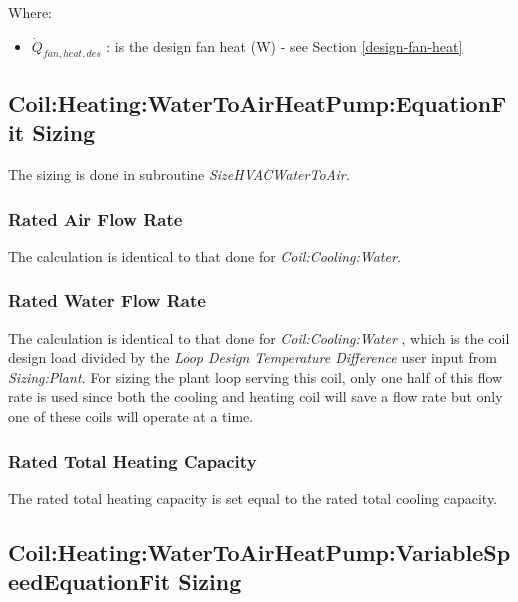 Where:

\begin{itemize}
\item
  \(\dot{Q}_{fan,heat,des}\) : is the design fan heat (W) - see Section \ref{design-fan-heat}
\end{itemize}

\subsection{Coil:Heating:WaterToAirHeatPump:EquationFit Sizing}\label{coilheatingwatertoairheatpumpequationfit-sizing}

The sizing is done in subroutine \emph{SizeHVACWaterToAir.}

\subsubsection{Rated Air Flow Rate}\label{rated-air-flow-rate-2}

The calculation is identical to that done for \emph{Coil:Cooling:Water}.

\subsubsection{Rated Water Flow Rate}\label{rated-water-flow-rate-2}

The calculation is identical to that done for \emph{Coil:Cooling:Water} , which is the coil design load divided by the \emph{Loop Design Temperature Difference} user input from \emph{Sizing:Plant.} For sizing the plant loop serving this coil, only one half of this flow rate is used since both the cooling and heating coil will save a flow rate but only one of these coils will operate at a time.

\subsubsection{Rated Total Heating Capacity}\label{rated-total-heating-capacity}

The rated total heating capacity is set equal to the rated total cooling capacity.

\subsection{Coil:Heating:WaterToAirHeatPump:VariableSpeedEquationFit Sizing}\label{coilheatingwatertoairheatpumpvariablespeedequationfit-sizing}

